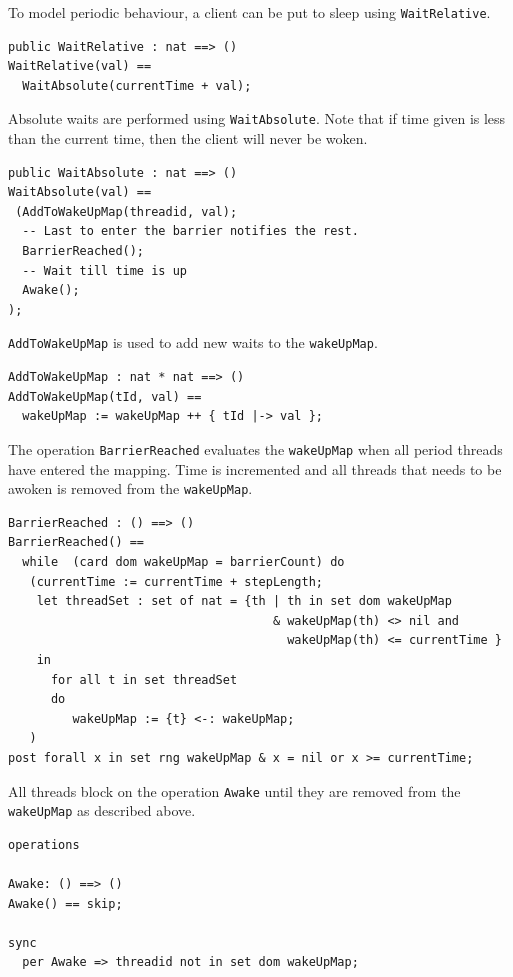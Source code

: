 \documentclass{overturerepchap}
\begin{document}
To model periodic behaviour, a client can be put to sleep using \texttt{WaitRelative}.

\begin{lstlisting}
public WaitRelative : nat ==> ()
WaitRelative(val) ==
  WaitAbsolute(currentTime + val);
\end{lstlisting}

Absolute waits are performed using \texttt{WaitAbsolute}. Note that if time
given is less than the current time, then the client will never be
woken.

\begin{lstlisting}
public WaitAbsolute : nat ==> ()
WaitAbsolute(val) ==
 (AddToWakeUpMap(threadid, val);
  -- Last to enter the barrier notifies the rest.
  BarrierReached();
  -- Wait till time is up
  Awake();
);
\end{lstlisting}

\texttt{AddToWakeUpMap} is used to add new waits to the \texttt{wakeUpMap}.

\begin{lstlisting}
AddToWakeUpMap : nat * nat ==> ()
AddToWakeUpMap(tId, val) ==
  wakeUpMap := wakeUpMap ++ { tId |-> val };
\end{lstlisting}

The operation \texttt{BarrierReached} evaluates the \texttt{wakeUpMap} when 
all period threads have entered the mapping. Time is incremented and all threads
that needs to be awoken is removed from the \texttt{wakeUpMap}.

\begin{lstlisting}
BarrierReached : () ==> ()
BarrierReached() == 
  while  (card dom wakeUpMap = barrierCount) do
   (currentTime := currentTime + stepLength;
    let threadSet : set of nat = {th | th in set dom wakeUpMap 
                                     & wakeUpMap(th) <> nil and 
                                       wakeUpMap(th) <= currentTime }
    in
      for all t in set threadSet 
      do
         wakeUpMap := {t} <-: wakeUpMap;
   )
post forall x in set rng wakeUpMap & x = nil or x >= currentTime;
\end{lstlisting}

All threads block on the operation \texttt{Awake} until they are removed from
the \texttt{wakeUpMap} as described above.

\begin{lstlisting}
operations

Awake: () ==> ()
Awake() == skip;

sync
  per Awake => threadid not in set dom wakeUpMap;
\end{lstlisting}
\end{document}
